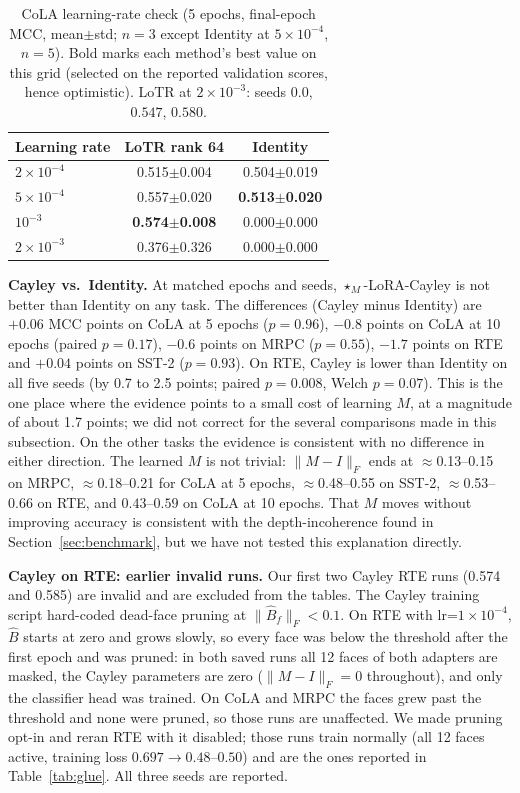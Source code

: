\documentclass{article}
\theoremstyle{plain}
\begin{document}
\begin{table}[h]
\centering
\caption{CoLA learning-rate check (5 epochs, final-epoch MCC, mean$\pm$std; $n=3$ except Identity at $5\times10^{-4}$, $n=5$). Bold marks each method's best value on this grid
(selected on the reported validation scores, hence optimistic). LoTR at $2\times10^{-3}$: seeds $0.0$, $0.547$, $0.580$.}
\label{tab:cola_lr}
\small
\begin{tabular}{lcc}
\toprule
Learning rate & LoTR rank 64 & Identity \\
\midrule
$2\times10^{-4}$ & 0.515$\pm$0.004 & 0.504$\pm$0.019 \\
$5\times10^{-4}$ & 0.557$\pm$0.020 & \textbf{0.513$\pm$0.020} \\
$10^{-3}$        & \textbf{0.574$\pm$0.008} & 0.000$\pm$0.000 \\
$2\times10^{-3}$ & 0.376$\pm$0.326 & 0.000$\pm$0.000 \\
\bottomrule
\end{tabular}
\end{table}

\textbf{Cayley vs.\ Identity.}
At matched epochs and seeds, $\star_M$-LoRA-Cayley is not better than Identity on any task.
The differences (Cayley minus Identity) are $+0.06$ MCC points on CoLA at 5 epochs ($p=0.96$),
$-0.8$ points on CoLA at 10 epochs (paired $p=0.17$), $-0.6$ points on MRPC ($p=0.55$), $-1.7$ points on RTE
and $+0.04$ points on SST-2 ($p=0.93$).
On RTE, Cayley is lower than Identity on all five seeds (by 0.7 to 2.5 points; paired $p=0.008$, Welch $p=0.07$).
This is the one place where the evidence points to a small cost of learning $M$, at a magnitude of about 1.7 points; we
did not correct for the several comparisons made in this subsection.
On the other tasks the evidence is consistent with no difference in either direction.
The learned $M$ is not trivial: $\|M-I\|_F$ ends at $\approx$0.13--0.15 on MRPC, $\approx$0.18--0.21 for CoLA at 5 epochs,
$\approx$0.48--0.55 on SST-2, $\approx$0.53--0.66 on RTE, and $0.43$--$0.59$ on CoLA at 10 epochs.
That $M$ moves without improving accuracy is consistent with the depth-incoherence found in
Section~\ref{sec:benchmark}, but we have not tested this explanation directly.

\textbf{Cayley on RTE: earlier invalid runs.}
Our first two Cayley RTE runs (0.574 and 0.585) are invalid and are excluded from the tables.
The Cayley training script hard-coded dead-face pruning at $\|\hat{B}_f\|_F<0.1$.
On RTE with lr=$1\times10^{-4}$, $\hat B$ starts at zero and grows slowly, so every face was below the threshold
after the first epoch and was pruned: in both saved runs all 12 faces of both adapters are masked, the Cayley
parameters are zero ($\|M-I\|_F=0$ throughout), and only the classifier head was trained.
On CoLA and MRPC the faces grew past the threshold and none were pruned, so those runs are unaffected.
We made pruning opt-in and reran RTE with it disabled; those runs train normally (all 12 faces active,
training loss $0.697\to0.48$--$0.50$) and are the ones reported in Table~\ref{tab:glue}.
All three seeds are reported.
\end{document}
